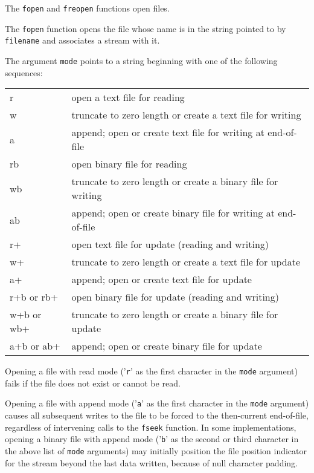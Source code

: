 The \texttt{fopen} and \texttt{freopen} functions open files.

The \texttt{fopen} function opens the file whose name is in the string pointed
to by \texttt{filename} and associates a stream with it.

The argument \texttt{mode} points to a string beginning with one of the
following sequences:

\begin{tabular}{l p{5.5cm}}
r          & open a text file for reading\\
w          & truncate to zero length or create a text file for writing\\
a          & append; open or create text file for writing at end-of-file\\
rb         & open binary file for reading\\
wb         & truncate to zero length or create a binary file for writing\\
ab         & append; open or create binary file for writing at end-of-file\\
r+         & open text file for update (reading and writing)\\
w+         & truncate to zero length or create a text file for update\\
a+         & append; open or create text file for update\\
r+b or rb+ & open binary file for update (reading and writing)\\
w+b or wb+ & truncate to zero length or create a binary file for update\\
a+b or ab+ & append; open or create binary file for update\\
\end{tabular}

Opening a file with read mode ('\texttt{r}' as the first character in the
\texttt{mode} argument) fails if the file does not exist or cannot be read.

Opening a file with append mode ('\texttt{a}' as the first character in the
\texttt{mode} argument) causes all subsequent writes to the file to be forced
to the then-current end-of-file, regardless of intervening calls to the
\texttt{fseek} function. In some implementations, opening a binary file with
append mode ('\texttt{b}' as the second or third character in the above list of
\texttt{mode} arguments) may initially position the file position indicator for
the stream beyond the last data written, because of null character padding.

